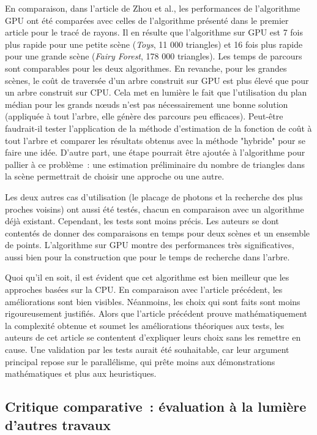 \documentclass[a4paper]{article}
\begin{document}
En comparaison, dans l'article de Zhou et al., les performances de l'algorithme GPU ont été comparées avec celles de l'algorithme présenté dans le premier article pour le tracé de rayons. Il en résulte que l'algorithme sur GPU est 7 fois plus rapide pour une petite scène (\textit{Toys}, 11 000 triangles) et 16 fois plus rapide pour une grande scène (\textit{Fairy Forest}, 178 000 triangles). Les temps de parcours sont comparables pour les deux algorithmes. En revanche, pour les grandes scènes, le coût de traversée d'un arbre construit sur GPU est plus élevé que pour un arbre construit sur CPU. Cela met en lumière le fait que l'utilisation du plan médian pour les grands nœuds n'est pas nécessairement une bonne solution (appliquée à tout l'arbre, elle génère des parcours peu efficaces). Peut-être faudrait-il tester l'application de la méthode d'estimation de la fonction de coût à tout l'arbre et comparer les résultats obtenus avec la méthode "hybride" pour se faire une idée. D'autre part, une étape pourrait être ajoutée à l'algorithme pour pallier à ce problème~: une estimation préliminaire du nombre de triangles dans la scène permettrait de choisir une approche ou une autre.

Les deux autres cas d'utilisation (le placage de photons et la recherche des plus proches voisins) ont aussi été testés, chacun en comparaison avec un algorithme déjà existant. Cependant, les tests sont moins précis. Les auteurs se dont contentés de donner des comparaisons en temps pour deux scènes et un ensemble de points. L'algorithme sur GPU montre des performances très significatives, aussi bien pour la construction que pour le temps de recherche dans l'arbre.

Quoi qu'il en soit, il est évident que cet algorithme est bien meilleur que les approches basées sur la CPU. En comparaison avec l'article précédent, les améliorations sont bien visibles. Néanmoins, les choix qui sont faits sont moins rigoureusement justifiés. Alors que l'article précédent prouve mathématiquement la complexité obtenue et soumet les améliorations théoriques aux tests, les auteurs de cet article se contentent d'expliquer leurs choix sans les remettre en cause. Une validation par les tests aurait été souhaitable, car leur argument principal repose sur le parallélisme, qui prête moins aux démonstrations mathématiques et plus aux heuristiques.

\subsection{Critique comparative~: évaluation à la lumière d'autres travaux}
\end{document}
